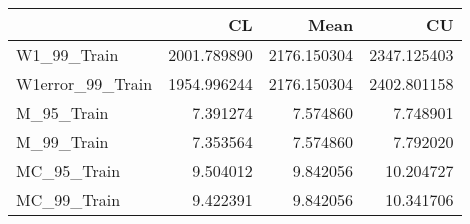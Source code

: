 \begin{tabular}{lrrr}
\toprule
{} &           CL &         Mean &           CU \\
\midrule
W1\_99\_Train      &  2001.789890 &  2176.150304 &  2347.125403 \\
W1error\_99\_Train &  1954.996244 &  2176.150304 &  2402.801158 \\
M\_95\_Train       &     7.391274 &     7.574860 &     7.748901 \\
M\_99\_Train       &     7.353564 &     7.574860 &     7.792020 \\
MC\_95\_Train      &     9.504012 &     9.842056 &    10.204727 \\
MC\_99\_Train      &     9.422391 &     9.842056 &    10.341706 \\
\bottomrule
\end{tabular}
